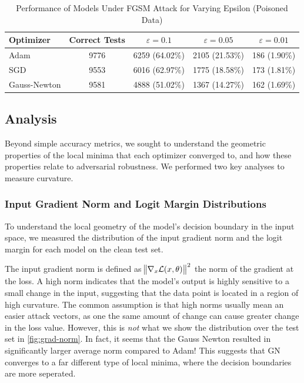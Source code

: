\documentclass{article}
\begin{document}
    \begin{table}[ht!]
        \centering
        \caption{Performance of Models Under FGSM Attack for Varying Epsilon (Poisoned Data)}
        \label{tab:fgsm_results_poisoned}
        \begin{tabular}{|l|c|c|c|c|}
            \hline
            \textbf{Optimizer} & \textbf{Correct Tests} & $\varepsilon=0.1$ & $\varepsilon=0.05$ & $\varepsilon=0.01$ \\
            \hline
            Adam               & 9776                   & 6259 (64.02\%)    & 2105 (21.53\%)     & 186 (1.90\%)       \\
            \hline
            SGD                & 9553                   & 6016 (62.97\%)    & 1775 (18.58\%)     & 173 (1.81\%)       \\
            \hline
            Gauss-Newton       & 9581                   & 4888 (51.02\%)    & 1367 (14.27\%)     & 162 (1.69\%)       \\
            \hline
        \end{tabular}
    \end{table}

    \subsection{Analysis}
    Beyond simple accuracy metrics, we sought to understand the geometric properties of the local minima that each optimizer converged to, and how these properties relate to adversarial robustness.
    We performed two key analyses to measure curvature.

    \subsubsection{Input Gradient Norm and Logit Margin Distributions}
    To understand the local geometry of the model's decision boundary in the input space, we measured the distribution of the input gradient norm and the logit margin for each model on the clean test set.

    The input gradient norm is defined as $\norm{\nabla_x \mathcal L(x, \theta)}^2$ the norm of the gradient at the loss.
    A high norm indicates that the model's output is highly sensitive to a small change in the input, suggesting that the data point is located in a region of high curvature.
    The common assumption is that high norms usually mean an easier attack vectors, as one the same amount of change can cause greater change in the loss value.
    However, this is \emph{not} what we show the distribution over the test set in \cref{fig:grad-norm}.
    In fact, it seems that the Gauss Newton resulted in significantly larger average norm compared to Adam!
    This suggests that GN converges to a far different type of local minima, where the decision boundaries are more seperated.
\end{document}
